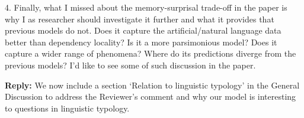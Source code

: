 \documentclass{article}[11pt,a4paper,oneside]
\newenvironment{reply}
  {\par\medskip
   \color{blue}%
   \begin{framed}
   \textbf{Reply: }\ignorespaces}
 {\end{framed}
  \medskip}
\begin{document}
4. Finally, what I missed about the memory-surprisal trade-off in the paper is why I as researcher should investigate it further and what it provides that previous models do not. Does it capture the artificial/natural language data better than dependency locality? Is it a more parsimonious model? Does it capture a wider range of phenomena? Where do its predictions diverge from the previous models? I'd like to see some of such discussion in the paper.

\begin{reply}
	We now include a section `Relation to linguistic typology' in the General Discussion to address the Reviewer's comment and why our model is interesting to questions in linguistic typology.
\end{reply}
\end{document}
